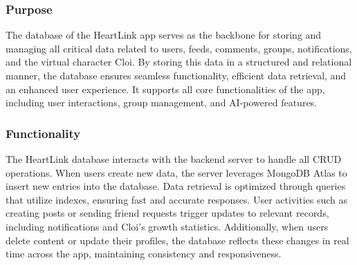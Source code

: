 \documentclass[conference]{IEEEtran}
\begin{document}
        \subsubsection{Purpose}
            The database of the HeartLink app serves as the backbone for storing and managing all critical data related to users, feeds, comments, groups, notifications, and the virtual character Cloi. By storing this data in a structured and relational manner, the database ensures seamless functionality, efficient data retrieval, and an enhanced user experience. It supports all core functionalities of the app, including user interactions, group management, and AI-powered features.\\
            \vspace{3mm}
        \subsubsection{Functionality}
            The HeartLink database interacts with the backend server to handle all CRUD operations. When users create new data, the server leverages MongoDB Atlas to insert new entries into the database. Data retrieval is optimized through queries that utilize indexes, ensuring fast and accurate responses. User activities such as creating posts or sending friend requests trigger updates to relevant records, including notifications and Cloi's growth statistics. Additionally, when users delete content or update their profiles, the database reflects these changes in real time across the app, maintaining consistency and responsiveness.\\
            \vspace{3mm}
\end{document}
